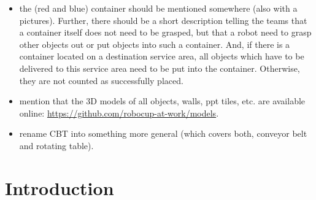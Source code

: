 \documentclass[11pt, twoside, openright, a4paper, chapterprefix]{scrbook}
\begin{document}


\begin{itemize}

	
	
	\item the (red and blue) container should be mentioned somewhere (also with a pictures). Further, there should be a short description telling the teams that a container itself does not need to be grasped, but that a robot need to grasp other objects out or put objects into such a container. And, if there is a container located on a destination service area, all objects which have to be delivered to this service area need to be put into the container. Otherwise, they are not counted as successfully placed.
	
	
	\item mention that the 3D models of all objects, walls, ppt tiles, etc. are available online: \url{https://github.com/robocup-at-work/models}.
	
	\item rename CBT into something more general (which covers both, conveyor belt and rotating table).
		
	
\end{itemize}


\pagestyle{empty}
\tableofcontents
\clearpage

\pagestyle{plain}

\chapter{Introduction}








\end{document}
